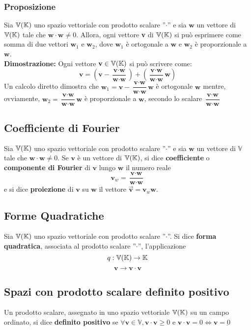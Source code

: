 \documentclass[../main.tex]{subfiles}
\begin{document}
\subsubsection{Proposizione}
Sia $\mathbb{V} (\mathbb{K})$ uno spazio vettoriale con prodotto scalare ''$\cdot$'' e sia
$\textbf{w}$ un vettore di $\mathbb{V} (\mathbb{K})$ tale che $\textbf{w}\cdot\textbf{w}\ne0$.
Allora, ogni vettore \textbf{v} di $\mathbb{V} (\mathbb{K})$ si può esprimere come somma di due
vettori $\textbf{w}_1$ e $\textbf{w}_2$, dove $\textbf{w}_1$ è ortogonale a
$\textbf{w}$ e $\textbf{w}_2$ è proporzionale a $\textbf{w}$. \\
\textbf{Dimostrazione:} Ogni vettore $\textbf{v}\in\mathbb{V} (\mathbb{K})$ si può scrivere come:
\[
    \textbf{v} = \left(\textbf{v}-\dfrac{\textbf{v}\cdot \textbf{w}}{\textbf{w}\cdot \textbf{w}}\right) + \left(\dfrac{\textbf{v}\cdot \textbf{w}}{\textbf{w}\cdot \textbf{w}}\textbf{w}\right)
\]
Un calcolo diretto dimostra che $\textbf{w}_1 =
    \textbf{v}-\dfrac{\textbf{v}\cdot \textbf{w}}{\textbf{w}\cdot
        \textbf{w}}\textbf{w}$ è ortogonale $\textbf{w}$ mentre, ovviamente,
$\textbf{w}_2 = \dfrac{\textbf{v}\cdot \textbf{w}}{\textbf{w}\cdot
        \textbf{w}}\textbf{w}$ è proporzionale a $\textbf{w}$, secondo lo scalare
$\dfrac{\textbf{v}\cdot \textbf{w}}{\textbf{w}\cdot \textbf{w}}$

\subsection{Coefficiente di Fourier}
Sia $\mathbb{V} (\mathbb{K})$ uno spazio vettoriale con prodotto scalare ''$\cdot$'' e sia
$\textbf{w}$ un vettore di $\mathbb{V}$ tale che
$\textbf{w}\cdot\textbf{w}\ne0$. Se $\textbf{v}$ è un vettore di $\mathbb{V} (\mathbb{K})$, si dice
\textbf{coefficiente} o \textbf{componente di Fourier} di $\textbf{v}$ lungo
$\textbf{w}$ il numero reale
\[
    \textbf{v}_w = \dfrac{\textbf{v}\cdot \textbf{w}}{\textbf{w}\cdot \textbf{w}}
\]
e si dice \textbf{proiezione} di $\textbf{v}$ su $\textbf{w}$ il vettore $
    \overrightarrow{\textbf{v}} = \textbf{v}_w\textbf{w}$.

\subsection{Forme Quadratiche}
Sia $\mathbb{V} (\mathbb{K})$ uno spazio vettoriale con prodotto scalare ''$\cdot$''. Si dice
\textbf{forma quadratica}, associata al prodotto scalare ''$\cdot$'',
l'applicazione
\[
    q: \mathbb{V} (\mathbb{K}) \rightarrow \mathbb{K}
\]
\[
    \textbf{v}\rightarrow\textbf{v}\cdot\textbf{v}
\]

\subsection{Spazi con prodotto scalare definito positivo}
Un prodotto scalare, assegnato in uno spazio vettoriale $\mathbb{V} (\mathbb{K})$ su un campo
ordinato, si dice \textbf{definito positivo} se
$\forall\textbf{v}\in\mathbb{V},\textbf{v}\cdot\textbf{v}\geq0$ e
$\textbf{v}\cdot\textbf{v}=0\iff\textbf{v}=\underbar{0}$
\end{document}
